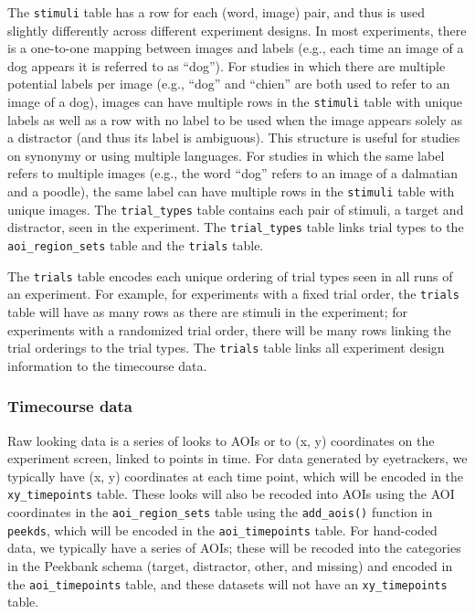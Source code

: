 \documentclass[
  english,
  man,floatsintext]{apa6}
\begin{document}
The \texttt{stimuli} table has a row for each (word, image) pair, and thus is used slightly differently across different experiment designs.
In most experiments, there is a one-to-one mapping between images and labels (e.g., each time an image of a dog appears it is referred to as \enquote{dog}).
For studies in which there are multiple potential labels per image (e.g., \enquote{dog} and \enquote{chien} are both used to refer to an image of a dog), images can have multiple rows in the \texttt{stimuli} table with unique labels as well as a row with no label to be used when the image appears solely as a distractor (and thus its label is ambiguous).
This structure is useful for studies on synonymy or using multiple languages.
For studies in which the same label refers to multiple images (e.g., the word \enquote{dog} refers to an image of a dalmatian and a poodle), the same label can have multiple rows in the \texttt{stimuli} table with unique images.
The \texttt{trial\_types} table contains each pair of stimuli, a target and distractor, seen in the experiment.
The \texttt{trial\_types} table links trial types to the \texttt{aoi\_region\_sets} table and the \texttt{trials} table.

The \texttt{trials} table encodes each unique ordering of trial types seen in all runs of an experiment.
For example, for experiments with a fixed trial order, the \texttt{trials} table will have as many rows as there are stimuli in the experiment; for experiments with a randomized trial order, there will be many rows linking the trial orderings to the trial types.
The \texttt{trials} table links all experiment design information to the timecourse data.

\hypertarget{timecourse-data-1}{%
\subsubsection{Timecourse data}\label{timecourse-data-1}}

Raw looking data is a series of looks to AOIs or to (x, y) coordinates on the experiment screen, linked to points in time.
For data generated by eyetrackers, we typically have (x, y) coordinates at each time point, which will be encoded in the \texttt{xy\_timepoints} table.
These looks will also be recoded into AOIs using the AOI coordinates in the \texttt{aoi\_region\_sets} table using the \texttt{add\_aois()} function in \texttt{peekds}, which will be encoded in the \texttt{aoi\_timepoints} table.
For hand-coded data, we typically have a series of AOIs; these will be recoded into the categories in the Peekbank schema (target, distractor, other, and missing) and encoded in the \texttt{aoi\_timepoints} table, and these datasets will not have an \texttt{xy\_timepoints} table.
\end{document}
